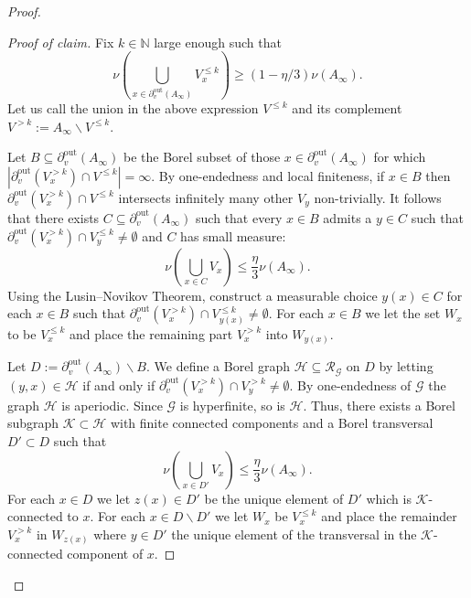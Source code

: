 \documentclass[letterpaper,11pt,reqno]{amsart}
\theoremstyle{bfnote}
\theoremstyle{definition}
\newcommand{\0}{\varnothing}
\renewcommand{\leq}{\leqslant}
\renewcommand{\geq}{\geqslant}
\numberwithin{equation}{section}
\begin{document}
\begin{proof}
\begin{proof}[Proof of claim]
     Fix $k\in \mathbb N$ large enough such that $$
    \nu \left(\bigcup_{x\in \partial_v^{\mathrm{out}} (A_\infty)} V_x^{\leq k}\right) \geq (1 - \eta/3) \nu (A_\infty).
    $$
    Let us call the union in the above expression $V^{\leq k}$ and its complement $V^{>k} := A_\infty \backslash V^{\leq k}$.
    
    Let $B \subseteq \partial_v^{\mathrm{out}} (A_\infty)$ be the Borel subset of those $x\in \partial_v^{\mathrm{out}} (A_\infty)$ for which $|\partial_v^{\mathrm{out}} (V_x^{>k}) \cap V^{\leq k} | = \infty$. By one-endedness and local finiteness, if $x \in B$ then $\partial_v^{\mathrm{out}} (V_x^{>k}) \cap V^{\leq k}$ intersects infinitely many other $V_y$ non-trivially. It follows that there exists $C \subseteq \partial_v^{\mathrm{out}} (A_\infty)$ such that every $x \in B$ admits a $y \in C$ such that $\partial_v^{\mathrm{out}} (V_x^{>k}) \cap V_y^{\leq k} \neq \emptyset$ and $C$ has small measure:
    $$
    \nu \left(\bigcup_{x\in C} V_x\right) \leq \frac{\eta}{3} \nu (A_\infty).
    $$
    Using the Lusin--Novikov Theorem, construct a measurable choice $y(x) \in C$ for each $x\in B$ such that $\partial_v^{\mathrm{out}} (V_x^{>k}) \cap V_{y(x)}^{\leq k} \neq \emptyset$. For each $x\in B$ we let the set $W_x$ to be $V_x^{\leq k}$ and place the remaining part $V_x^{> k}$ into $W_{y(x)}$. 
    

    Let $D := \partial_v^{\mathrm{out}} (A_\infty) \backslash B$. We define a Borel graph $\mathcal H\subseteq\mathcal{R}_{\mathcal{G}}$ on $D$ by letting $(y,x) \in \mathcal H$ if and only if $\partial_v^{\mathrm{out}} (V_x^{> k}) \cap V^{> k}_y \neq \emptyset$. By one-endedness of $\mathcal{G}$ the graph $\mathcal{H}$ is aperiodic. Since $\mathcal G$ is hyperfinite, so is $\mathcal H$. Thus, there exists a Borel subgraph $\mathcal K \subset \mathcal H$ with finite connected components and a Borel transversal $D' \subset D$ such that 
    $$
    \nu \left(\bigcup_{x\in D'} V_x\right) \leq \frac{\eta}{3} \nu (A_\infty).
    $$
    For each $x\in D$ we let $z(x) \in D'$ be the unique element of $D'$ which is $\mathcal K$-connected to $x$. For each $x\in D \backslash D'$ we let $W_x$ be $V_x^{\leq k}$ and place the remainder $V_x^{>k}$ in $W_{z(x)}$ where $y \in D'$ the unique element of the transversal in the $\mathcal K$-connected component of $x$. 


\end{proof}
\end{proof}
\end{document}
